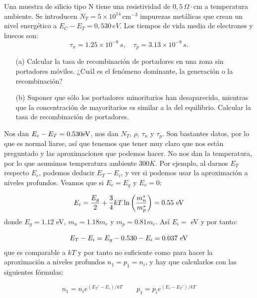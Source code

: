 \begin{texercise}
	Una muestra de silicio tipo N tiene una resistividad de \(0,5 \, \Omega \cdot \text{cm}\) a temperatura ambiente. Se introducen \(N_T = 5 \times 10^{14} \, \text{cm}^{-3}\) impurezas metálicas que crean un nivel energético a \(E_C - E_T = 0,530 \, eV\). Los tiempos de vida media de electrones y huecos son:
	\[
		\tau_n = 1.25 \times 10^{-8} \, s, \quad \tau_p = 3.13 \times 10^{-8} \, s.
	\]
	\begin{itemize}
		\item[(a)] Calcular la tasa de recombinación de portadores en una zona sin portadores móviles. ¿Cuál es el fenómeno dominante, la generación o la recombinación?
		\item[(b)] Suponer que sólo los portadores minoritarios han desaparecido, mientras que la concentración de mayoritarios es similar a la del equilibrio. Calcular la tasa de recombinación de portadores.
	\end{itemize}

	\tcblower

	Nos dan $E_c-E_T=0.530\text{eV}$, nos dan $N_T$, $\rho$, $\tau_n$ y $\tau_p$. Son bastantes datos, por lo que es normal liarse, así que tenemos que tener muy claro que nos están preguntado y las aproximaciones que podemos hacer. No nos dan la temperatura, por lo que asumimos temperatura ambiente $300K$. Por ejemplo, al darnos $E_T$ respecto $E_c$, podemos deducir $E_T-E_i$, y ver si podemos usar la aproximación a niveles profundos. Veamos que si $E_c=E_g$ y $E_v=0$:
	
	\begin{equation}
		E_i = \frac{E_g}{2} + \frac{3}{4} kT \ln \left( \frac{m_n^*}{m_p^*} \right) = 0.55 \ \text{eV}
	\end{equation}
	donde $E_g=1.12$ eV, $m_n=1.18m_e$ y $m_p=0.81m_e$. Así $E_i=$ eV y por tanto:

	\begin{equation}
		E_T - E_i = E_g - 0.530 - E_i =0.037 \ \eV		
	\end{equation}
	que es comparable a $kT$ y por tanto no suficiente como para hacer la aproximación a niveles profundos $n_1=p_1=n_i$, y hay que calcularlos con las siguientes fórmulas:

	\begin{equation}
		n_1 = n_i e^{(E_T'-E_i)/kT} 	\qquad 
		p_1 = p_i e^{(E_i-E_T')/kT}
	\end{equation}


\end{texercise}
